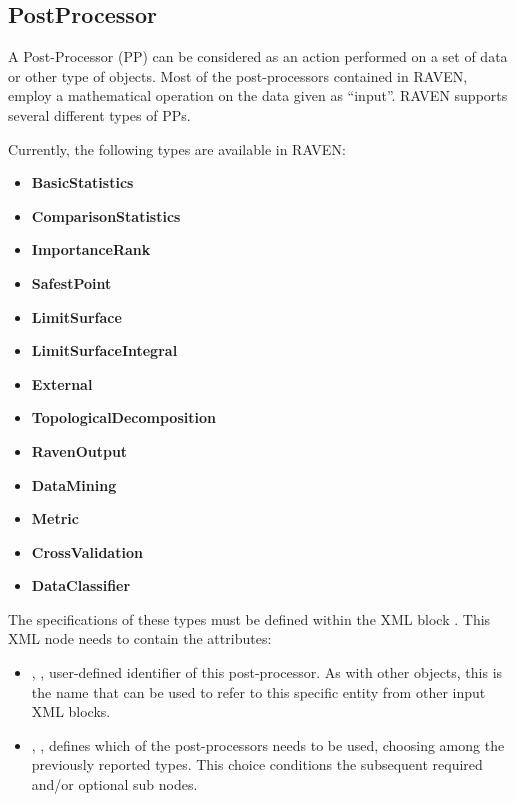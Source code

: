 \subsection{PostProcessor}
\label{sec:models_postProcessor}
A Post-Processor (PP) can be considered as an action performed on a set of data
or other type of objects.
%
Most of the post-processors contained in RAVEN, employ a mathematical operation
on the data given as ``input''.
%
RAVEN supports several different types of PPs.

Currently, the following types are available in RAVEN:
\begin{itemize}
  \itemsep0em
  \item \textbf{BasicStatistics}
  \item \textbf{ComparisonStatistics}
  \item \textbf{ImportanceRank}
  \item \textbf{SafestPoint}
  \item \textbf{LimitSurface}
  \item \textbf{LimitSurfaceIntegral}
  \item \textbf{External}
  \item \textbf{TopologicalDecomposition}
  \item \textbf{RavenOutput}
  \item \textbf{DataMining}
  \item \textbf{Metric}
  \item \textbf{CrossValidation}
  \item \textbf{DataClassifier}
\end{itemize}

The specifications of these types must be defined within the XML block
.
%
This XML node needs to contain the attributes:
\vspace{-5mm}
\begin{itemize}
  \itemsep0em
  \item {}, , user-defined
  identifier of this post-processor.
  \nb As with other objects, this is the name that can be used to refer to this
  specific entity from other input XML blocks.
  \item {}, , defines which of
  the post-processors needs to be used, choosing among the previously reported
  types.
  This choice conditions the subsequent required and/or optional
   sub nodes.
\end{itemize}
\vspace{-5mm}

